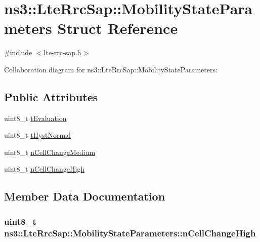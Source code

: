 \hypertarget{structns3_1_1LteRrcSap_1_1MobilityStateParameters}{}\section{ns3\+:\+:Lte\+Rrc\+Sap\+:\+:Mobility\+State\+Parameters Struct Reference}
\label{structns3_1_1LteRrcSap_1_1MobilityStateParameters}


{\ttfamily \#include $<$lte-\/rrc-\/sap.\+h$>$}



Collaboration diagram for ns3\+:\+:Lte\+Rrc\+Sap\+:\+:Mobility\+State\+Parameters\+:
\subsection*{Public Attributes}
\begin{DoxyCompactItemize}
\item 
uint8\+\_\+t \hyperlink{structns3_1_1LteRrcSap_1_1MobilityStateParameters_a7e9a414d1e84cee306117afbf92ee5e1}{t\+Evaluation}
\item 
uint8\+\_\+t \hyperlink{structns3_1_1LteRrcSap_1_1MobilityStateParameters_ad766d02b317550e93758310bbc6016c7}{t\+Hyst\+Normal}
\item 
uint8\+\_\+t \hyperlink{structns3_1_1LteRrcSap_1_1MobilityStateParameters_a967cbee6afce4687f2f45fe3108b9f48}{n\+Cell\+Change\+Medium}
\item 
uint8\+\_\+t \hyperlink{structns3_1_1LteRrcSap_1_1MobilityStateParameters_a08e4ab55c44286ba3fdedc5ce0fe481f}{n\+Cell\+Change\+High}
\end{DoxyCompactItemize}


\subsection{Member Data Documentation}
\subsubsection[{\texorpdfstring{n\+Cell\+Change\+High}{nCellChangeHigh}}]{\setlength{\rightskip}{0pt plus 5cm}uint8\+\_\+t ns3\+::\+Lte\+Rrc\+Sap\+::\+Mobility\+State\+Parameters\+::n\+Cell\+Change\+High}\hypertarget{structns3_1_1LteRrcSap_1_1MobilityStateParameters_a08e4ab55c44286ba3fdedc5ce0fe481f}{}\label{structns3_1_1LteRrcSap_1_1MobilityStateParameters_a08e4ab55c44286ba3fdedc5ce0fe481f}
